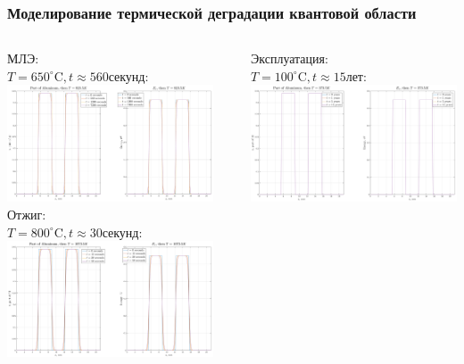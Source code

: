 \documentclass[10pt,pdf,hyperref={unicode},aspectratio={169}]{beamer}
\begin{document}
\begin{frame}
	\frametitle{Моделирование термической деградации квантовой области}
	\centering
	\begin{columns}
		{\color{blue} МЛЭ:}\\
		{\color{red} $T = 650^\circ\text{C}, t \approx 560\text{секунд}$:}\\
	   	\includegraphics[width=0.8\linewidth,center]{assets/DA650}\\
		{\color{blue} Отжиг:}\\
		{\color{red} $T = 800^\circ\text{C}, t \approx 30\text{секунд}$:}\\
	   	\includegraphics[width=.8\linewidth,center]{assets/DA800}
	   	\newline\newline\newline\newline
		\rule[17mm]{0.2ex}{76mm}
		{\color{blue} Эксплуатация:}\\
		{\color{red} $T = 100^\circ\text{C}, t \approx 15\text{лет}$:}\\
	   	\includegraphics[width=0.8\linewidth,center]{assets/DA100}\\

\end{columns}
\end{frame}
\end{document}
